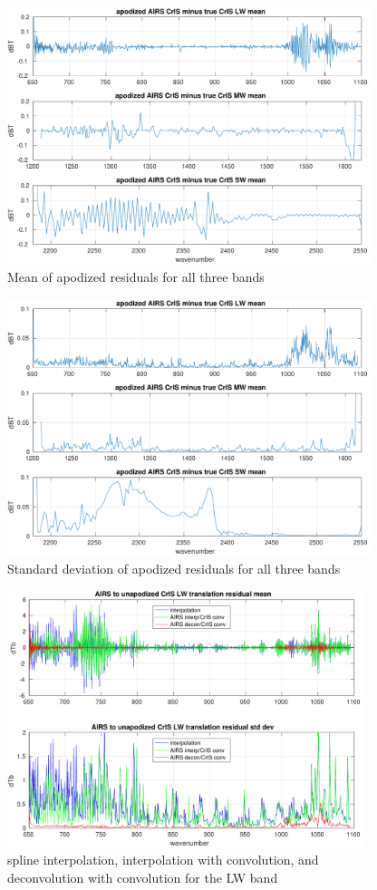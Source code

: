 \documentclass[11pt]{article}
\begin{document}
\begin{figure} %
  \centering
  \includegraphics[height=7.5cm]{figures/combo_ap_dif_mean.pdf}
  \caption{Mean of apodized residuals for all three {\cris} bands}
  \label{meanAll}
\end{figure}

\begin{figure} %
  \centering
  \includegraphics[height=7.5cm]{figures/combo_ap_dif_std.pdf}
  \caption{Standard deviation of apodized residuals for all three
    {\cris} bands}
  \label{stdAll}
\end{figure}

\begin{figure} %
  \centering
  \includegraphics[height=7.5cm]{figures/a2cris_interp_LW.pdf}
  \caption{spline interpolation, interpolation with convolution, 
    and deconvolution with convolution for the {\cris} LW band}
  \label{intpLW}
\end{figure}
\end{document}
